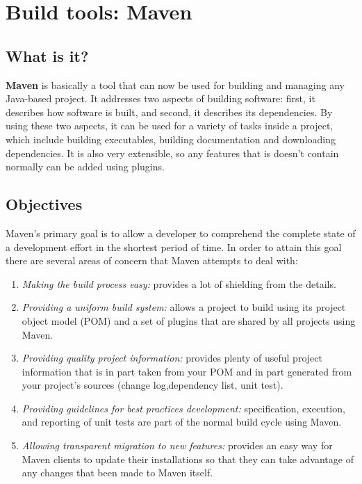 \section{Build tools: Maven}

\subsection{What is it?}

\begin{flushleft}
\textbf{Maven} is basically a tool that can now be used for building and managing any Java-based project. It addresses two aspects of building software: first, it describes how software is built, and second, it describes its dependencies. By using these two aspects, it can be used for a variety of tasks inside a project, which include building executables, building documentation and downloading dependencies. It is also very extensible, so any features that is doesn't contain normally can be added using plugins. 

\end{flushleft}


\subsection{Objectives}

Maven’s primary goal is to allow a developer to comprehend the complete state of a development effort in the shortest period of time. In order to attain this goal there are several areas of concern that Maven attempts to deal with: 

\begin{enumerate}
\item \textit{Making the build process easy:} provides a lot of shielding from the details.

\item \textit{Providing a uniform build system:} allows a project to build using its project object model (POM) and a set of plugins that are shared by all projects using Maven.

\item \textit{Providing quality project information:} provides plenty of useful project information that is in part taken from your POM and in part generated from your project’s sources (change log,dependency list, unit test).

\item \textit{Providing guidelines for best practices development:} specification, execution, and reporting of unit tests are part of the normal build cycle using Maven.

\item \textit{Allowing transparent migration to new features:} provides an easy way for Maven clients to update their installations so that they can take advantage of any changes that been made to Maven itself.

\end{enumerate}

